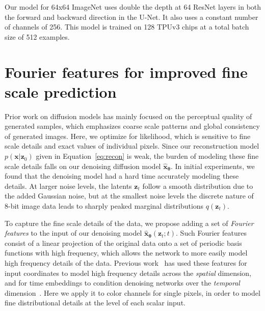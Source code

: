 \documentclass{article}
\def\Eqref#1{Equation~\ref{#1}}
\def\rvx{{\mathbf{x}}}
\def\rvz{{\mathbf{z}}}
\newcommand{\bT}{{\boldsymbol{\theta}}}
\begin{document}
Our model for 64x64 ImageNet uses double the depth at 64 ResNet layers in both the forward and backward direction in the U-Net. It also uses a constant number of channels of 256. This model is trained on 128 TPUv3 chips at a total batch size of 512 examples. 

\section{Fourier features for improved fine scale prediction}
\label{sec:fourier}
Prior work on diffusion models has mainly focused on the perceptual quality of generated samples, which emphasizes coarse scale patterns and global consistency of generated images. Here, we optimize for likelihood, which is sensitive to fine scale details and exact values of individual pixels. Since our reconstruction model $p(\rvx|\rvz_{0})$ given in \Eqref{eq:recon} is weak, the burden of modeling these fine scale details falls on our denoising diffusion model $\hat{\rvx}_{\bT}$. In initial experiments, we found that the denoising model had a hard time accurately modeling these details. At larger noise levels, the latents $\rvz_t$ follow a smooth distribution due to the added Gaussian noise, but at the smallest noise levels the discrete nature of 8-bit image data leads to sharply peaked marginal distributions $q(\rvz_t)$.



To capture the fine scale details of the data, we propose adding a set of \emph{Fourier features} to the input of our denoising model $\hat{\rvx}_{\bT}(\rvz_t; t)$. Such Fourier features consist of a linear projection of the original data onto a set of periodic basis functions with high frequency, which allows the network to more easily model high frequency details of the data. Previous work~\citep{tancik2020fourier} has used these features for input coordinates to model high frequency details across the \emph{spatial} dimension, and for time embeddings to condition denoising networks over the \emph{temporal} dimension~\citep{song2020score}. Here we apply it to color channels for single pixels, in order to model fine distributional details at the level of each scalar input.
\end{document}
